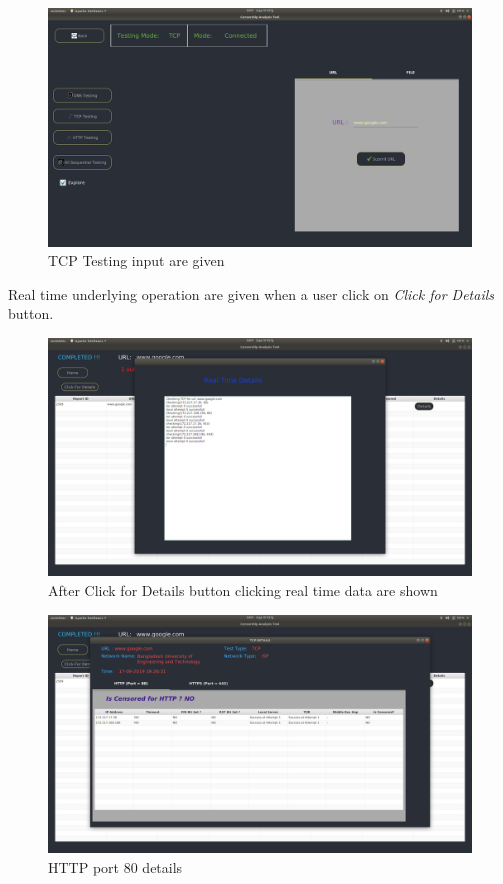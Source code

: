 \begin{figure}[h]
    \centering
    \includegraphics[width=\textwidth]{usersite/18tcptest2.png}
    \caption{TCP Testing input are given}
    \label{fig:user17}
\end{figure}

Real time underlying operation are given when a user click on \emph{Click for Details} button.

\begin{figure}[h]
    \centering
    \includegraphics[width=\textwidth]{usersite/19realtime.png}
    \caption{After Click for Details button clicking real time data are shown }
    \label{fig:user18}
\end{figure}

\begin{figure}[h]
    \centering
    \includegraphics[width=\textwidth]{usersite/20tcpdetailshttp.png}
    \caption{HTTP port 80 details}
    \label{fig:user19}
\end{figure}


